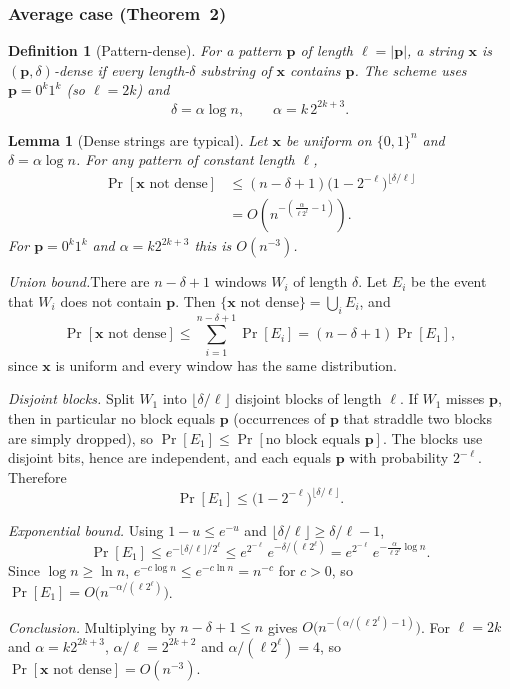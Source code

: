 \documentclass[journal,10pt]{IEEEtran}
\newtheorem{definition}{Definition}
\newtheorem{lemma}{Lemma}
\newcommand{\step}[1]{\par\smallskip\noindent\emph{#1}\enspace}
\newcommand{\bx}{\mathbf{x}}
\newcommand{\bp}{\mathbf{p}}
\begin{document}
\subsubsection{Average case (Theorem~2)}\label{sec:avg}
\begin{definition}[Pattern-dense]
For a pattern $\bp$ of length $\ell=|\bp|$, a string $\bx$ is $(\bp,\delta)$-dense if every length-$\delta$ substring of $\bx$ contains $\bp$. The scheme uses $\bp=0^k1^k$ (so $\ell=2k$) and
\[
\delta=\alpha\log n,\qquad\alpha=k\,2^{2k+3}.
\]
\end{definition}

\begin{lemma}[Dense strings are typical]\label{lem:dense}
Let $\bx$ be uniform on $\{0,1\}^n$ and $\delta=\alpha\log n$. For any pattern of constant length $\ell$,
\begin{align*}
\Pr[\bx\text{ not dense}]&\le(n-\delta+1)\bigl(1-2^{-\ell}\bigr)^{\lfloor\delta/\ell\rfloor}\\
&=O\!\left(n^{-\left(\frac{\alpha}{\ell 2^{\ell}}-1\right)}\right).
\end{align*}
For $\bp=0^k1^k$ and $\alpha=k2^{2k+3}$ this is $O(n^{-3})$.
\end{lemma}
\begin{IEEEproof}
\emph{Union bound.}\enspace There are $n-\delta+1$ windows $W_i$ of length $\delta$. Let $E_i$ be the event that $W_i$ does not contain $\bp$. Then $\{\bx\text{ not dense}\}=\bigcup_iE_i$, and
\[
\Pr[\bx\text{ not dense}]\le\sum_{i=1}^{n-\delta+1}\Pr[E_i]=(n-\delta+1)\Pr[E_1],
\]
since $\bx$ is uniform and every window has the same distribution.

\step{Disjoint blocks.} Split $W_1$ into $\lfloor\delta/\ell\rfloor$ disjoint blocks of length $\ell$. If $W_1$ misses $\bp$, then in particular no block equals $\bp$ (occurrences of $\bp$ that straddle two blocks are simply dropped), so $\Pr[E_1]\le\Pr[\text{no block equals }\bp]$. The blocks use disjoint bits, hence are independent, and each equals $\bp$ with probability $2^{-\ell}$. Therefore
\[
\Pr[E_1]\le\bigl(1-2^{-\ell}\bigr)^{\lfloor\delta/\ell\rfloor}.
\]

\step{Exponential bound.} Using $1-u\le e^{-u}$ and $\lfloor\delta/\ell\rfloor\ge\delta/\ell-1$,
\[
\Pr[E_1]\le e^{-\lfloor\delta/\ell\rfloor/2^{\ell}}\le e^{2^{-\ell}}\,e^{-\delta/(\ell2^{\ell})}=e^{2^{-\ell}}\,e^{-\frac{\alpha}{\ell2^{\ell}}\log n}.
\]
Since $\log n\ge\ln n$, $e^{-c\log n}\le e^{-c\ln n}=n^{-c}$ for $c>0$, so $\Pr[E_1]=O\bigl(n^{-\alpha/(\ell2^\ell)}\bigr)$.

\step{Conclusion.} Multiplying by $n-\delta+1\le n$ gives $O\bigl(n^{-(\alpha/(\ell2^\ell)-1)}\bigr)$. For $\ell=2k$ and $\alpha=k2^{2k+3}$, $\alpha/\ell=2^{2k+2}$ and $\alpha/(\ell2^{\ell})=4$, so $\Pr[\bx\text{ not dense}]=O(n^{-3})$.
\end{IEEEproof}
\end{document}
